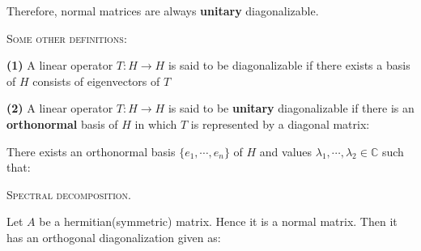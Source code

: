 \documentclass{article}
\newcounter{theorem}
\begin{document}
Therefore, normal matrices are always \textbf{unitary} diagonalizable.

\skl
\textsc{Some other definitions:}

\textbf{(1)} A linear operator $T: H \longrightarrow H $ is said to be diagonalizable if there exists a basis of $H$ consists of eigenvectors of $T$


\textbf{(2)} A linear operator $T: H \longrightarrow H $ is said to be \textbf{unitary} diagonalizable if there is an \textbf{orthonormal} basis of $H$ in which $T$ is represented by a diagonal matrix:

There exists an orthonormal basis $\lbrace e_1, \cdots , e_n \rbrace$ of $H$ and values $\lambda_1, \cdots , \lambda_2 \in \mathbb{C} $ such that:




\skl
\textsc{Spectral decomposition.}

Let $A$ be a hermitian(symmetric) matrix. Hence it is a normal matrix. Then it has an orthogonal diagonalization given as:

\end{document}
